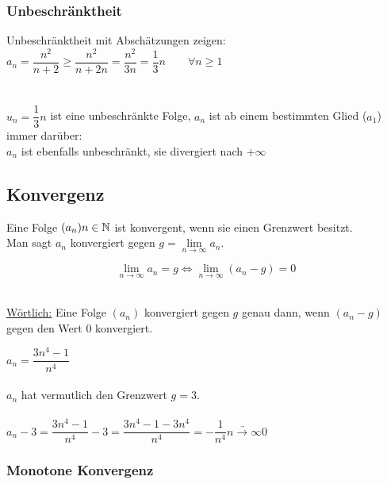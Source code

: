 \documentclass[main.tex]{subfiles}
\begin{document}
		\subsubsection{Unbeschränktheit}

\begin{Beispiel}
Unbeschränktheit mit Abschätzungen zeigen:\\
$a_n=\dfrac{n^2}{n+2}\geq\dfrac{n^2}{n+2n}=\dfrac{n^2}{3n}=\dfrac{1}{3}n\qquad\forall n\geq1$\\\\
\\$u_n=\dfrac{1}{3}n$ ist eine unbeschränkte Folge, $a_n$ ist ab einem bestimmten Glied ($a_1$) immer darüber:
\\$a_n$ ist ebenfalls unbeschränkt, sie divergiert nach $+\infty$
\end{Beispiel}


	\subsection{Konvergenz}

\begin{Definition}
Eine Folge $(a_n)n\in\mathbb{N}$ ist konvergent, wenn sie einen Grenzwert besitzt.\\
Man sagt $a_n$ konvergiert gegen $g=\lim\limits_{n\to\infty}a_n$.
\end{Definition}



\begin{Theorem}

$$\lim\limits_{n\to\infty}a_n=g\Leftrightarrow \lim\limits_{n\to\infty}(a_n-g)=0$$
\end{Theorem}
\\
\underline{Wörtlich:} Eine Folge $(a_n)$ konvergiert gegen $g$ genau dann, wenn $(a_n-g)$ gegen den Wert $0$ konvergiert.

\begin{Beispiel}
$a_n=\dfrac{3n^4-1}{n^4}$\\\\
$a_n$ hat vermutlich den Grenzwert $g=3$.\\\\
$a_n-3=\dfrac{3n^4-1}{n^4}-3=\dfrac{3n^4-1-3n^4}{n^4}=-\dfrac{1}{n^4}\underrightarrow{n\rightarrow \infty}0$
\end{Beispiel}
\subsubsection{Monotone Konvergenz}
\end{document}
